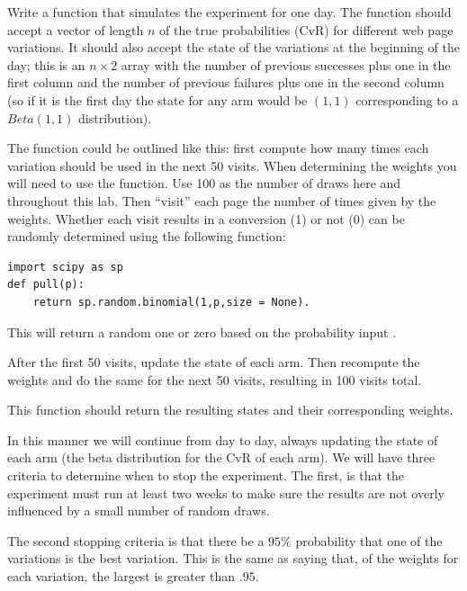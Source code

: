 \begin{problem}
Write a function that simulates the experiment for one day.  
The function should accept a vector of length $n$ of the true probabilities (CvR) 
for different web page variations.  It should also accept the state of the variations 
at the beginning of the day; this is an $n \times 2$ array with the number of previous 
successes plus one in the first column and the number of previous failures plus one in 
the second column (so if it is the first day the state for any arm would be $(1,1)$ 
corresponding to a $Beta(1,1)$ distribution).

The function could be outlined like this: first compute how many times each variation 
should be used in the next 50 visits.  When determining the weights you will need to use 
the  function.  Use 100 as the number of draws here and throughout this lab. 
Then ``visit'' each page the number of times given by the weights.  
Whether each visit results in a conversion (1) or not (0) can be randomly determined using the following function:
\begin{lstlisting}
import scipy as sp
def pull(p):
    return sp.random.binomial(1,p,size = None).
\end{lstlisting}
This will return a random one or zero based on the probability input .

After the first 50 visits, update the state of each arm.  
Then recompute the weights and do the same for the next 50 visits, resulting in 100 visits total.

This function should return the resulting states and their corresponding weights.
\end{problem}

In this manner we will continue from day to day, always updating the state of each arm 
(the beta distribution for the CvR of each arm).  We will have three criteria to determine when to stop the experiment.  
The first, is that the experiment must run at least two weeks to make sure the 
results are not overly influenced by a small number of random draws.

The second stopping criteria is that there be a $95\%$ probability that one of the variations is the best variation.
This is the same as saying that, of the weights for each variation, the largest is greater than $.95$.

